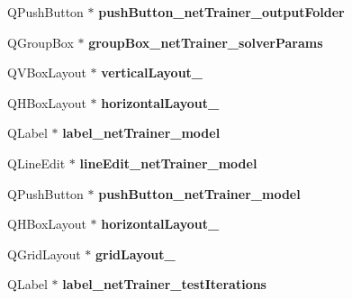 \begin{DoxyCompactItemize}
\item 
\mbox{\label{class_ui___main_window_aa9d07f06c387a4872e7304330a69cc2e}} 
Q\+Push\+Button $\ast$ {\bfseries push\+Button\+\_\+net\+Trainer\+\_\+output\+Folder}
\item 
\mbox{\label{class_ui___main_window_af52ee0fc7f12e635232ec86e4651a86f}} 
Q\+Group\+Box $\ast$ {\bfseries group\+Box\+\_\+net\+Trainer\+\_\+solver\+Params}
\item 
\mbox{\label{class_ui___main_window_a9e0b3adf005fbcdb0364e0bba347fef8}} 
Q\+V\+Box\+Layout $\ast$ {\bfseries vertical\+Layout\+\_}
\item 
\mbox{\label{class_ui___main_window_a2afb915e1492b7e6704db4918c1e5e80}} 
Q\+H\+Box\+Layout $\ast$ {\bfseries horizontal\+Layout\+\_}
\item 
\mbox{\label{class_ui___main_window_a1fbacf0f3f9d81a4621c787793b3e5bc}} 
Q\+Label $\ast$ {\bfseries label\+\_\+net\+Trainer\+\_\+model}
\item 
\mbox{\label{class_ui___main_window_aa0b33968b6f78ae1503a80792aeef773}} 
Q\+Line\+Edit $\ast$ {\bfseries line\+Edit\+\_\+net\+Trainer\+\_\+model}
\item 
\mbox{\label{class_ui___main_window_a757953c86b9d68419943907148447599}} 
Q\+Push\+Button $\ast$ {\bfseries push\+Button\+\_\+net\+Trainer\+\_\+model}
\item 
\mbox{\label{class_ui___main_window_ab48e49d68609b4c66e5169e2f87e3eb9}} 
Q\+H\+Box\+Layout $\ast$ {\bfseries horizontal\+Layout\+\_}
\item 
\mbox{\label{class_ui___main_window_af42ea7d4c2e893181caad21e28166932}} 
Q\+Grid\+Layout $\ast$ {\bfseries grid\+Layout\+\_}
\item 
\mbox{\label{class_ui___main_window_aa0c015d10071e201fdf393247a25e0ac}} 
Q\+Label $\ast$ {\bfseries label\+\_\+net\+Trainer\+\_\+test\+Iterations}
\item 

\end{DoxyCompactItemize}
